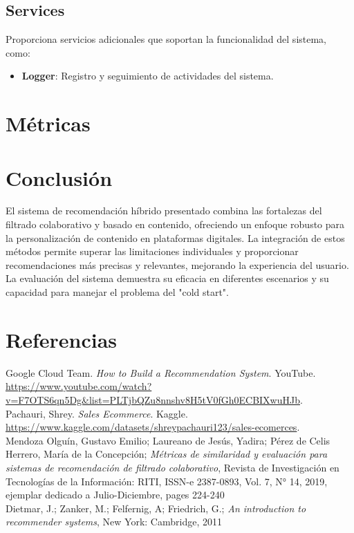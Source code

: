 \documentclass{llncs}
\begin{document}
\subsection{Services}
Proporciona servicios adicionales que soportan la funcionalidad del sistema, como:

\begin{itemize}
    \item \textbf{Logger}: Registro y seguimiento de actividades del sistema.
\end{itemize}

\section{Métricas}

\section{Conclusión}
El sistema de recomendación híbrido presentado combina las fortalezas del filtrado colaborativo y basado en contenido, ofreciendo un enfoque robusto para la personalización de contenido en plataformas digitales. La integración de estos métodos permite superar las limitaciones individuales y proporcionar recomendaciones más precisas y relevantes, mejorando la experiencia del usuario. La evaluación del sistema demuestra su eficacia en diferentes escenarios y su capacidad para manejar el problema del "cold start".

\section{Referencias}
\begin{thebibliography}{99}
Google Cloud Team. \textit{How to Build a Recommendation System}. YouTube. \url{https://www.youtube.com/watch?v=F7OTS6qn5Dg&list=PLTjbQZu8nnshv8H5tV0fGh0ECBIXwuHJb}.\\

Pachauri, Shrey. \textit{Sales Ecommerce}. Kaggle. \url{https://www.kaggle.com/datasets/shreypachauri123/sales-ecomerces}.\\

Mendoza Olguín, Gustavo Emilio; Laureano de Jesús, Yadira; Pérez de Celis Herrero, María de la Concepción; \textit{Métricas de similaridad y evaluación para sistemas de recomendación de filtrado colaborativo}, Revista de Investigación en Tecnologías de la Información: RITI, ISSN-e 2387-0893, Vol. 7, N° 14, 2019, ejemplar dedicado a Julio-Diciembre, pages 224-240\\

Dietmar, J.; Zanker, M.; Felfernig, A; Friedrich, G.; \textit{An introduction to recommender systems}, New York: Cambridge, 2011\\

\end{thebibliography}
\end{document}
